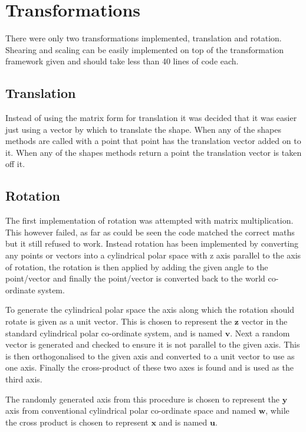  \section{Transformations}
    There were only two transformations implemented, translation and rotation.
    Shearing and scaling can be easily implemented on top of the transformation
    framework given and should take less than 40 lines of code each.

    \subsection{Translation}
      Instead of using the matrix form for translation it was decided that it
      was easier just using a vector by which to translate the shape.  When any
      of the shapes methods are called with a point that point has the
      translation vector added on to it.  When any of the shapes methods return
      a point the translation vector is taken off it.

    \subsection{Rotation}
      The first implementation of rotation was attempted with matrix
      multiplication.  This however failed, as far as could be seen the code
      matched the correct maths but it still refused to work.  Instead rotation
      has been implemented by converting any points or vectors into a
      cylindrical polar space with z axis parallel to the axis of rotation, the
      rotation is then applied by adding the given angle to the point/vector and
      finally the point/vector is converted back to the world co-ordinate
      system.

      To generate the cylindrical polar space the axis along which the rotation
      should rotate is given as a unit vector. This is chosen to represent the
      $\mathbf{z}$ vector in the standard cylindrical polar co-ordinate system,
      and is named $\mathbf{v}$.
      Next a random vector is generated and checked to ensure it is not parallel
      to the given axis.  This is then orthogonalised to the given axis and
      converted to a unit vector to use as one axis.  Finally the cross-product
      of these two axes is found and is used as the third axis.

      The randomly generated axis from this procedure is chosen to represent the
      $\mathbf{y}$ axis from conventional cylindrical polar co-ordinate space
      and named $\mathbf{w}$, while the cross product is chosen to represent
      $\mathbf{x}$ and is named $\mathbf{u}$.

